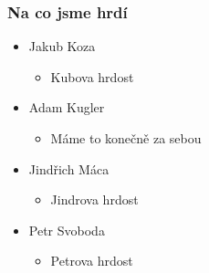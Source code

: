 \documentclass{beamer}
\begin{document}

\begin{frame}[allowframebreaks]\frametitle{Na co jsme hrdí} 
  \begin{itemize}
    \item Jakub Koza
      \begin{itemize}
       \item Kubova hrdost
     \end{itemize}
   
    \item Adam Kugler
      \begin{itemize}
       \item Máme to konečně za sebou
     \end{itemize}

    \item Jindřich Máca
      \begin{itemize}
       \item Jindrova hrdost
      \end{itemize}  
   
    \item Petr Svoboda
      \begin{itemize}
       \item Petrova hrdost
     \end{itemize}
   \end{itemize}  
\end{frame}
\end{document}
